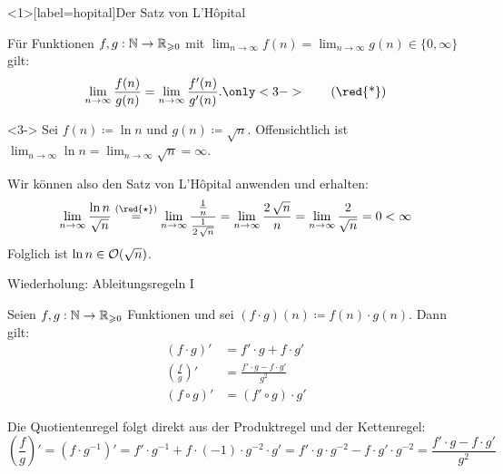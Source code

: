 \begin{frame}<1>[label=hopital]{Der Satz von L'H\^opital}
\begin{theorem}
F\"ur Funktionen $f, g : \mathbb{N} \to \mathbb{R}_{\geqslant 0}$ mit $\lim_{n \to \infty} f(n) = \lim_{n \to \infty} g(n) \in \{ 0, \infty \}$ gilt: 
\begin{equation*}
    \lim_{n \to \infty} \frac{f(n)}{g(n)} = \lim_{n \to \infty} \frac{f'(n)}{g'(n)}.\only<3->{\tag{\red{*}}}
\end{equation*}
\end{theorem}

\pause

\begin{example}<3->
Sei $f(n) \coloneqq \ln n$ und $g(n) \coloneqq \sqrt{n}$.
Offensichtlich ist $\lim_{n \to \infty} \ln n = \lim_{n \to \infty} \sqrt{n} = \infty$.

Wir k\"onnen also den Satz von L'H\^opital anwenden und erhalten:
$$\lim_{n \to \infty} \frac{\ln n}{\sqrt{n}} \overset{(\red{\star})}{=} \lim_{n \to \infty} \frac{\frac{1}{n}}{\frac{1}{2 \, \sqrt{n}}} = \lim_{n \to \infty} \frac{2 \, \sqrt{n}}{n} = \lim_{n \to \infty} \frac{2}{\sqrt{n}} = 0 < \infty$$
Folglich ist $\ln n \in \mathcal{O}(\sqrt{n})$.
\end{example}
\end{frame}

\begin{frame}{Wiederholung: Ableitungsregeln I}
\begin{theorem}\label{complexity:thm:diff_rules}
Seien $f, g: \mathbb{N} \to \mathbb{R}_{\geqslant 0}$ Funktionen und sei $(f \cdot g)(n) \coloneqq f(n) \cdot g(n)$.
Dann gilt:
\begin{align*}
    (f \cdot g)' &= f' \cdot g + f \cdot g' \tag{Produktregel} \\
    \left(\frac{f}{g}\right)' &= \frac{f' \cdot g - f \cdot g'}{g^2} \tag{Quotientenregel} \\
    (f \circ g)' &= (f' \circ g) \cdot g' \tag{Kettenregel}
\end{align*}
\end{theorem}

\begin{remark}
Die Quotientenregel folgt direkt aus der Produktregel und der Kettenregel: $$\left(\frac{f}{g}\right)' = (f \cdot g^{-1})' = f' \cdot g^{-1} + f \cdot (-1) \cdot g^{-2} \cdot g' = f' \cdot g \cdot g^{-2} - f \cdot g' \cdot g^{-2} = \frac{f' \cdot g - f \cdot g'}{g^2}$$
\end{remark}
\end{frame}

